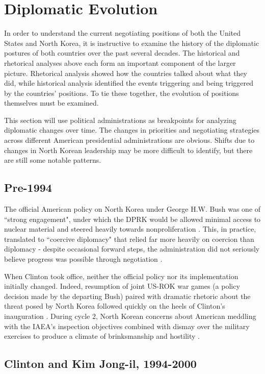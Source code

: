 \documentclass{article}
\begin{document}
\section{Diplomatic Evolution}

In order to understand the current negotiating positions of both the United States and North Korea, it is instructive to examine the history of the diplomatic postures of both countries over the past several decades. The historical and rhetorical analyses above each form an important component of the larger picture. Rhetorical analysis showed how the countries talked about what they did, while historical analysis identified the events triggering and being triggered by the countries' positions. To tie these together, the evolution of positions themselves must be examined.

This section will use political administrations as breakpoints for analyzing diplomatic changes over time. The changes in priorities and negotiating strategies across different American presidential administrations are obvious. Shifts due to changes in North Korean leadership may be more difficult to identify, but there are still some notable patterns.

\subsection{Pre-1994}

The official American policy on North Korea under George H.W. Bush was one of ``strong engagement", under which the DPRK would be allowed minimal access to nuclear material and steered heavily towards nonproliferation \cite{cerami}. This, in practice, translated to ``coercive diplomacy" that relied far more heavily on coercion than diplomacy - despite occasional forward steps, the administration did not seriously believe progress was possible through negotiation \cite{sigal}.

When Clinton took office, neither the official policy nor its implementation initially changed. Indeed, resumption of joint US-ROK war games (a policy decision made by the departing Bush) paired with dramatic rhetoric about the threat posed by North Korea followed quickly on the heels of Clinton's inauguration \cite{cumings}. During cycle 2, North Korean concerns about American meddling with the IAEA's inspection objectives combined with dismay over the military exercises to produce a climate of brinksmanship and hostility \cite{cumings}.

\subsection{Clinton and Kim Jong-il, 1994-2000}
\end{document}
